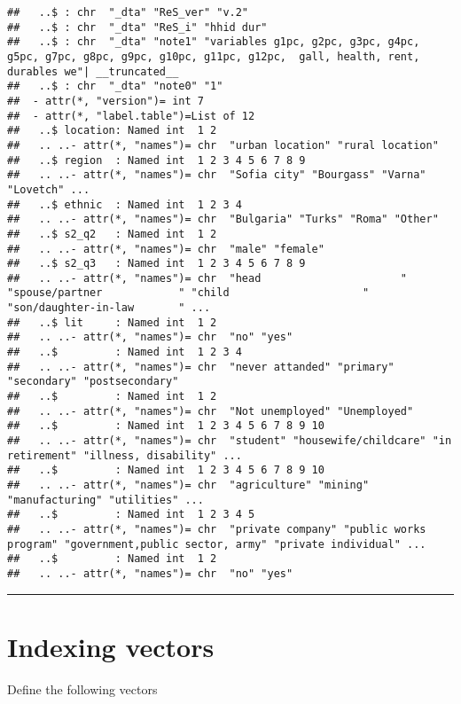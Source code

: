 \documentclass[]{article}
\begin{document}
\begin{verbatim}
##   ..$ : chr  "_dta" "ReS_ver" "v.2"
##   ..$ : chr  "_dta" "ReS_i" "hhid dur"
##   ..$ : chr  "_dta" "note1" "variables g1pc, g2pc, g3pc, g4pc, g5pc, g7pc, g8pc, g9pc, g10pc, g11pc, g12pc,  gall, health, rent, durables we"| __truncated__
##   ..$ : chr  "_dta" "note0" "1"
##  - attr(*, "version")= int 7
##  - attr(*, "label.table")=List of 12
##   ..$ location: Named int  1 2
##   .. ..- attr(*, "names")= chr  "urban location" "rural location"
##   ..$ region  : Named int  1 2 3 4 5 6 7 8 9
##   .. ..- attr(*, "names")= chr  "Sofia city" "Bourgass" "Varna" "Lovetch" ...
##   ..$ ethnic  : Named int  1 2 3 4
##   .. ..- attr(*, "names")= chr  "Bulgaria" "Turks" "Roma" "Other"
##   ..$ s2_q2   : Named int  1 2
##   .. ..- attr(*, "names")= chr  "male" "female"
##   ..$ s2_q3   : Named int  1 2 3 4 5 6 7 8 9
##   .. ..- attr(*, "names")= chr  "head                      " "spouse/partner            " "child                     " "son/daughter-in-law       " ...
##   ..$ lit     : Named int  1 2
##   .. ..- attr(*, "names")= chr  "no" "yes"
##   ..$         : Named int  1 2 3 4
##   .. ..- attr(*, "names")= chr  "never attanded" "primary" "secondary" "postsecondary"
##   ..$         : Named int  1 2
##   .. ..- attr(*, "names")= chr  "Not unemployed" "Unemployed"
##   ..$         : Named int  1 2 3 4 5 6 7 8 9 10
##   .. ..- attr(*, "names")= chr  "student" "housewife/childcare" "in retirement" "illness, disability" ...
##   ..$         : Named int  1 2 3 4 5 6 7 8 9 10
##   .. ..- attr(*, "names")= chr  "agriculture" "mining" "manufacturing" "utilities" ...
##   ..$         : Named int  1 2 3 4 5
##   .. ..- attr(*, "names")= chr  "private company" "public works program" "government,public sector, army" "private individual" ...
##   ..$         : Named int  1 2
##   .. ..- attr(*, "names")= chr  "no" "yes"
\end{verbatim}

\begin{center}\rule{0.5\linewidth}{\linethickness}\end{center}

\section{Indexing vectors}\label{indexing-vectors}

Define the following vectors
\end{document}

